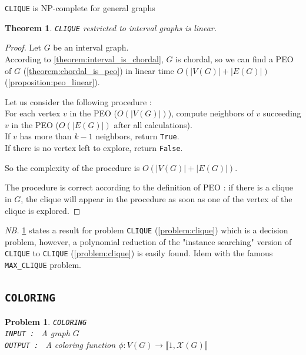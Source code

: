 \documentclass{article}
\newtheorem{theorem}{Theorem}[section]
\newtheorem{problem}{Problem}[section]
\begin{document}
\texttt{CLIQUE} is NP-complete for general graphs %

\begin{theorem}
    \label{theorem:clique_is_p}
    \texttt{CLIQUE} restricted to interval graphs is linear.
\end{theorem}

\begin{proof}
    Let $G$ be an interval graph.\\
    According to \cref{theorem:interval_is_chordal}, 
    $G$ is chordal, so we can find a PEO of $G$ (\cref{theorem:chordal_is_peo}) 
    in linear time $O(| V(G)|+| E(G)|)$ (\cref{proposition:peo_linear}). \medskip

    Let us consider the following procedure : \\
    For each vertex $v$ in the PEO ($O(| V(G)|)$), compute neighbors of $v$ succeeding $v$ in the PEO ($O(| E(G) |)$ after all calculations). \\
    If $v$ has more than $k-1$ neighbors, return \texttt{True}. \\
    If there is no vertex left to explore, return \texttt{False}. \medskip

    So the complexity of the procedure is $O(|V(G)|+|E(G)|)$. \medskip

    The procedure is correct according to the definition of PEO : 
    if there is a clique in $G$, the clique will appear in the procedure as soon as one of the vertex of the clique is explored.
\end{proof}

\textit{NB.} \cref{theorem:clique_is_p} states a result for problem \texttt{CLIQUE} (\cref{problem:clique})
which is a decision problem, however, a polynomial reduction of the "instance searching" version of 
\texttt{CLIQUE} to \texttt{CLIQUE} (\cref{problem:clique}) is easily found. Idem with the famous \texttt{MAX\_CLIQUE}
problem.

\subsection{\texttt{COLORING}}

\begin{problem}
    \texttt{COLORING} \\
    \texttt{INPUT : } A graph $G$ \\
    \texttt{OUTPUT : } A coloring function $\phi : V(G) \rightarrow \llbracket 1, \mathcal{X}(G) \rrbracket$
\end{problem}
\end{document}
